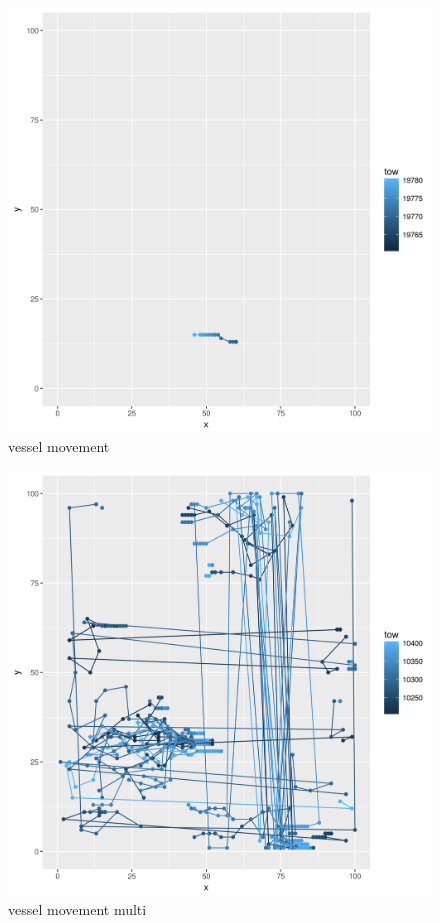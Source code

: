 \documentclass[review]{elsarticle}
\begin{document}
\begin{figure}[!ht]
	\includegraphics[width = \linewidth]{../tests/plots/vessel_move}
		\caption{vessel movement}
\end{figure}	

\begin{figure}[!ht]
	\includegraphics[width = \linewidth]{../tests/plots/vessel_multi_move}
		\caption{vessel movement multi}
\end{figure}	
\end{document}
